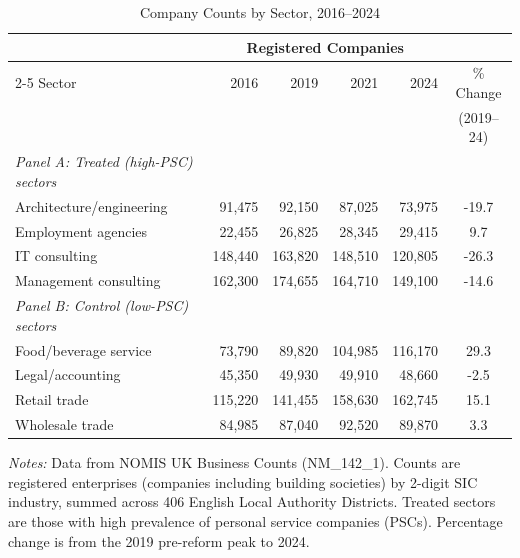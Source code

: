 \begin{table}[htbp]
\centering
\caption{Company Counts by Sector, 2016--2024}
\label{tab:descriptive}
\begin{threeparttable}
\begin{tabular}{lrrrrc}
\toprule
 & \multicolumn{4}{c}{Registered Companies} & \\
\cmidrule(lr){2-5}
Sector & 2016 & 2019 & 2021 & 2024 & \% Change \\
 & & & & & (2019--24) \\
\midrule
\emph{Panel A: Treated (high-PSC) sectors} & & & & & \\
Architecture/engineering & 91,475 & 92,150 & 87,025 & 73,975 & -19.7 \\
Employment agencies & 22,455 & 26,825 & 28,345 & 29,415 & 9.7 \\
IT consulting & 148,440 & 163,820 & 148,510 & 120,805 & -26.3 \\
Management consulting & 162,300 & 174,655 & 164,710 & 149,100 & -14.6 \\
\addlinespace
\emph{Panel B: Control (low-PSC) sectors} & & & & & \\
Food/beverage service & 73,790 & 89,820 & 104,985 & 116,170 & 29.3 \\
Legal/accounting & 45,350 & 49,930 & 49,910 & 48,660 & -2.5 \\
Retail trade & 115,220 & 141,455 & 158,630 & 162,745 & 15.1 \\
Wholesale trade & 84,985 & 87,040 & 92,520 & 89,870 & 3.3 \\
\bottomrule
\end{tabular}
\begin{tablenotes}[flushleft]
\small
\item \textit{Notes:} Data from NOMIS UK Business Counts (NM\_142\_1). Counts are registered enterprises (companies including building societies) by 2-digit SIC industry, summed across 406 English Local Authority Districts. Treated sectors are those with high prevalence of personal service companies (PSCs). Percentage change is from the 2019 pre-reform peak to 2024.
\end{tablenotes}
\end{threeparttable}
\end{table}
